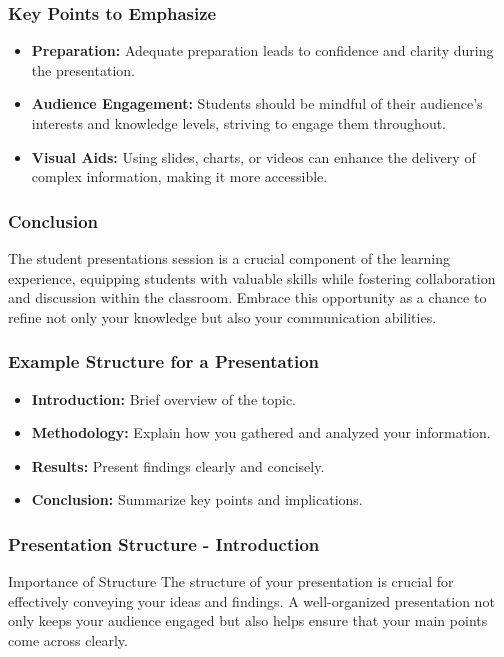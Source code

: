 \documentclass[aspectratio=169]{beamer}
\begin{document}
\begin{frame}[fragile]
    \frametitle{Key Points to Emphasize}
    \begin{itemize}
        \item \textbf{Preparation:} Adequate preparation leads to confidence and clarity during the presentation.
        \item \textbf{Audience Engagement:} Students should be mindful of their audience's interests and knowledge levels, striving to engage them throughout.
        \item \textbf{Visual Aids:} Using slides, charts, or videos can enhance the delivery of complex information, making it more accessible.
    \end{itemize}
\end{frame}

\begin{frame}[fragile]
    \frametitle{Conclusion}
    The student presentations session is a crucial component of the learning experience, equipping students with valuable skills while fostering collaboration and discussion within the classroom. Embrace this opportunity as a chance to refine not only your knowledge but also your communication abilities.
\end{frame}

\begin{frame}[fragile]
    \frametitle{Example Structure for a Presentation}
    \begin{itemize}
        \item \textbf{Introduction:} Brief overview of the topic.
        \item \textbf{Methodology:} Explain how you gathered and analyzed your information.
        \item \textbf{Results:} Present findings clearly and concisely.
        \item \textbf{Conclusion:} Summarize key points and implications.
    \end{itemize}
\end{frame}

\begin{frame}[fragile]
    \frametitle{Presentation Structure - Introduction}
    \begin{block}{Importance of Structure}
        The structure of your presentation is crucial for effectively conveying your ideas and findings. A well-organized presentation not only keeps your audience engaged but also helps ensure that your main points come across clearly.
    \end{block}
\end{frame}
\end{document}
